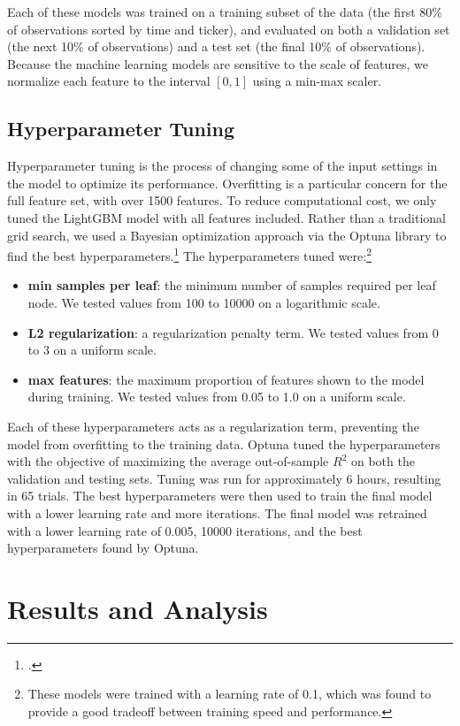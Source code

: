 \documentclass[12pt]{article}
\begin{document}
Each of these models was trained on a training subset of the data (the first 80\% of observations sorted by time and ticker), and evaluated on both a validation set (the next 10\% of observations) and a test set (the final 10\% of observations). Because the machine learning models are sensitive to the scale of features, we normalize each feature to the interval $[0,1]$ using a min-max scaler.

\subsection{Hyperparameter Tuning}
Hyperparameter tuning is the process of changing some of the input settings in the model to optimize its performance. Overfitting is a particular concern for the full feature set, with over 1500 features. To reduce computational cost, we only tuned the LightGBM model with all features included. Rather than a traditional grid search, we used a Bayesian optimization approach via the Optuna library to find the best hyperparameters.\footnote{\textcite{optuna_2019}.} The hyperparameters tuned were:\footnote{These models were trained with a learning rate of 0.1, which was found to provide a good tradeoff between training speed and performance.}
\begin{itemize}
\singlespacing
    \item \textbf{min samples per leaf}: the minimum number of samples required per leaf node. We tested values from 100 to 10000 on a logarithmic scale.
    \item \textbf{L2 regularization}: a regularization penalty term. We tested values from 0 to 3 on a uniform scale.
    \item \textbf{max features}: the maximum proportion of features shown to the model during training. We tested values from 0.05 to 1.0 on a uniform scale.
\end{itemize}
Each of these hyperparameters acts as a regularization term, preventing the model from overfitting to the training data. Optuna tuned the hyperparameters with the objective of maximizing the average out-of-sample $R^2$ on both the validation and testing sets. Tuning was run for approximately 6 hours, resulting in 65 trials. The best hyperparameters were then used to train the final model with a lower learning rate and more iterations. The final model was retrained with a lower learning rate of 0.005, 10000 iterations, and the best hyperparameters found by Optuna.

\section{Results and Analysis}
\end{document}
